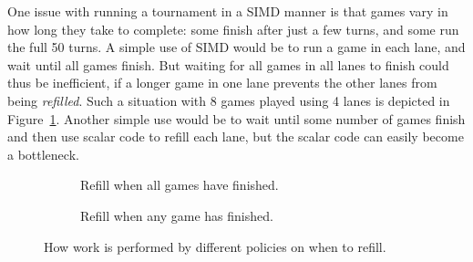 One issue with running a tournament in a SIMD manner is that
games vary in how long they take to complete: some finish after just
a few turns, and some run the full 50 turns. A simple use of SIMD would
be to run a game in each lane, and wait until all games finish. But
waiting for all games in all lanes to finish could thus be inefficient,
if a longer game in one lane prevents the other lanes from being
\emph{refilled}. Such a situation with 8 games played using 4 lanes is
depicted in Figure~\ref{fig:refill-all-policy}. Another simple use would be
to wait until some number of games finish and then use scalar code to
refill each lane, but the scalar code can easily become a bottleneck.

\newcommand{\game}[4]{
  \draw[fill=white] (#1, #2) rectangle +(#3, 0.5);
  \node at (#1 + 0.25, #2 + 0.25) {#4};
}
\begin{figure}
  \begin{subfigure}[b]{\textwidth}
    \caption{Refill when all games have finished.}
    \label{fig:refill-all-policy}
  \end{subfigure}
  
  \vspace{1em}
  
  \begin{subfigure}[b]{\textwidth}
    \caption{Refill when any game has finished.}
    \label{fig:refill-any-policy}
  \end{subfigure}
  \caption{How work is performed by different policies on when to refill.}
\end{figure}

